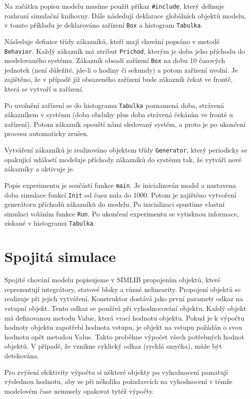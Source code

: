 \documentclass[a4paper]{article}
\begin{document}
Na začátku popisu modelu musíme použít příkaz \verb|#include|, který
definuje rozhraní simulační knihovny. Dále následují deklarace
globálních objektů modelu, v tomto příkladu je deklarováno
zařízení \verb|Box| a histogram \verb|Tabulka|.

Následuje definice třídy zákazníků, kteří mají chování popsáno
v metodě \verb|Behavior|. Každý zákazník má atribut \verb|Prichod|, kterým je
doba jeho příchodu do modelovaného systému. Zákazník obsadí
zařízení \verb|Box| na dobu 10 časových jednotek (není důležité,
jde-li o hodiny či sekundy) a potom zařízení uvolní. Je
zajištěno, že v případě již obsazeného zařízení bude zákazník
čekat ve frontě, která se vytvoří u zařízení.

Po uvolnění zařízení se do histogramu \verb|Tabulka| poznamená doba,
strávená zákazníkem v systému (doba obsluhy plus doba strávená
čekáním ve frontě u zařízení). Potom zákazník opouští námi
sledovaný systém, a proto je po ukončení procesu automaticky
zrušen.

Vytváření zákazníků je realizováno objektem třídy \verb|Generator|,
který periodicky se opakující událostí modeluje příchody
zákazníků do systému tak, že vytváří nové zákazníky a aktivuje
je.

Popis experimentu je součástí funkce \verb|main|. Je inicializován
model a nastavena doba simulace funkcí \verb|Init| od času nula do
1000. Potom je zajištěno vytvoření generátoru příchodů zákazníků
do modelu. Po inicializaci spustíme vlastní simulaci voláním
funkce \verb|Run|. Po ukončení experimentu se vytisknou informace,
získané v histogramu \verb|Tabulka|.


\section{Spojitá simulace}

Spojité chování modelu popisujeme v SIMLIB propojením objektů,
které reprezentují integrátory, stavové bloky a různé
nelinearity. Propojení objektů se realizuje při jejich
vytváření. Konstruktor dostává jako první parametr odkaz na
vstupní objekt. Tento odkaz se používá při vyhodnocování
objektu. Každý objekt má definovanou metodu Value, která vrací
hodnotu objektu. Pokud je k výpočtu hodnoty objektu zapotřebí
hodnota vstupu, je objekt na vstupu požádán o svou hodnotu opět
metodou Value. Takto proběhne výpočet všech potřebných hodnot
objektů. V případě, že vznikne cyklický odkaz (rychlá smyčka),
může být detekována.


Pro zvýšení efektivity výpočtu si některé objekty po vyhodnocení
pamatují výslednou hodnotu, aby se při několika požadavcích na
vyhodnocení v témže modelovém čase nemusely opakovat tytéž
výpočty.
\end{document}
